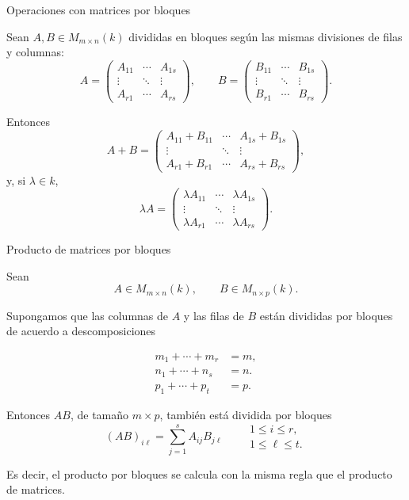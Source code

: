 \begin{frame}{Operaciones con matrices por bloques}

Sean \(A,B\in M_{m\times n}(k)\) divididas en bloques según las
mismas divisiones de filas y columnas:
\[
A=
\left(
\begin{array}{c|c|c}
A_{11} & \cdots & A_{1s}\\
\hline
\vdots & \ddots & \vdots\\
\hline
A_{r1} & \cdots & A_{rs}
\end{array}
\right),
\qquad
B=
\left(
\begin{array}{c|c|c}
B_{11} & \cdots & B_{1s}\\
\hline
\vdots & \ddots & \vdots\\
\hline
B_{r1} & \cdots & B_{rs}
\end{array}
\right).
\]

Entonces
\[
A+B=
\left(
\begin{array}{c|c|c}
A_{11}+B_{11} & \cdots & A_{1s}+B_{1s}\\
\hline
\vdots & \ddots & \vdots\\
\hline
A_{r1}+B_{r1} & \cdots & A_{rs}+B_{rs}
\end{array}
\right),
\]
y, si \(\lambda\in k\),
\[
\lambda A=
\left(
\begin{array}{c|c|c}
\lambda A_{11} & \cdots & \lambda A_{1s}\\
\hline
\vdots & \ddots & \vdots\\
\hline
\lambda A_{r1} & \cdots & \lambda A_{rs}
\end{array}
\right).
\]

\end{frame}

\begin{frame}{Producto de matrices por bloques}

Sean
\[
A\in M_{m\times n}(k),
\qquad
B\in M_{n\times p}(k).
\]

Supongamos que las columnas de \(A\) y las filas de \(B\) están
divididas por bloques de acuerdo a descomposiciones 

\begin{align*}
m_1+\cdots+m_r&=m,\\
n_1+\cdots+n_s&=n.\\
p_1+\cdots+p_t&=p.
\end{align*}

Entonces \(AB\), de tamaño $m\times p$, también está dividida por bloques
\[
\boxed{
(AB)_{i\ell}
=
\sum_{j=1}^{s} A_{ij}B_{j\ell}
}
\qquad
\begin{matrix}
1\leq i\leq r,\\
1\leq \ell\leq t.
\end{matrix}
\]

\medskip

Es decir, el producto por bloques se calcula con la misma regla
que el producto de matrices.

\end{frame}